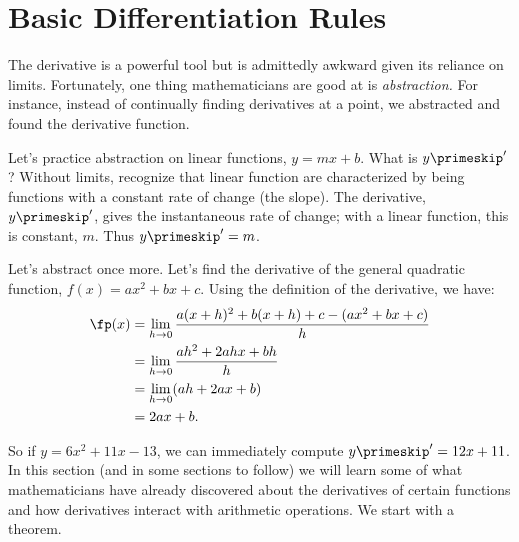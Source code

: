 \section{Basic Differentiation Rules}\label{sec:basic_diff_rules}

The derivative is a powerful tool but is admittedly awkward given its reliance on limits. Fortunately, one thing mathematicians are good at is \textit{abstraction.} For instance, instead of continually finding derivatives at a point, we abstracted and found the derivative function. 

Let's practice abstraction on linear functions, $y=mx+b$. What is $y\primeskip'$? Without limits, recognize that linear function are characterized by being functions with a constant rate of change (the slope). The derivative, $y\primeskip'$, gives the instantaneous rate of change; with a linear function, this is constant, $m$. Thus $y\primeskip'=m$. 

Let's abstract once more. Let's find the derivative of the general quadratic function, $f(x) = ax^2+bx+c$. Using the definition of the derivative, we have:
		\begin{align*}
		\fp(x) 	&=	\lim_{h\to 0}\frac{a(x+h)^2+b(x+h)+c-(ax^2+bx+c)}{h} \\
						&=	\lim_{h\to 0} \frac{ah^2+2ahx+bh}{h} \\
						&=	\lim_{h\to 0} (ah+2ax+b)\\
						&= 2ax+b.
		\end{align*}
		
So if $y = 6x^2+11x-13$, we can immediately compute $y\primeskip' = 12x+11$. \\

In this section (and in some sections to follow) we will learn some of what mathematicians have already discovered about the derivatives of certain functions and how derivatives interact with arithmetic operations. We start with a theorem.

